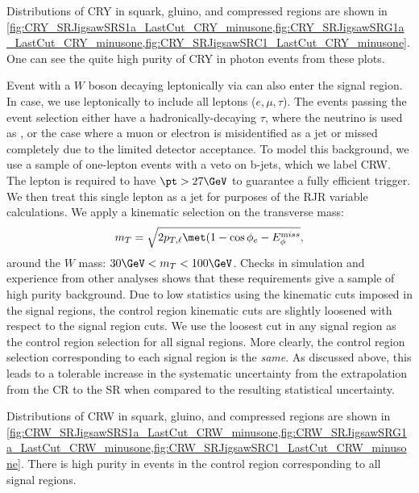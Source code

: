 Distributions of CRY in squark, gluino, and compressed regions are shown in \ref{fig:CRY_SRJigsawSRS1a_LastCut_CRY_minusone,fig:CRY_SRJigsawSRG1a_LastCut_CRY_minusone,fig:CRY_SRJigsawSRC1_LastCut_CRY_minusone}.
One can see the quite high purity of CRY in photon events from these plots.

Event with a $W$ boson decaying leptonically via \wln can also enter the signal region.
In case, we use leptonically to include all leptons ($e,\mu,\tau$).
The \wjets events passing the event selection either have a hadronically-decaying $\tau$, where the neutrino is used as \met, or the case where a muon or electron is misidentified as a jet or missed completely due to the limited detector acceptance.
To model this background, we use a sample of one-lepton events with a veto on b-jets, which we label CRW.
The lepton is required to have $\pt > 27 \GeV$ to guarantee a fully efficient trigger.
We then treat this single lepton as a jet for purposes of the RJR variable calculations.
We apply a kinematic selection on the transverse mass:
\begin{align}
m_T = \sqrt{2p_{T,\ell} \met ( 1 - \cos{ \phi_{e} - \metphi } },
\end{align}
around the $W$ mass: $30 \GeV < m_T < 100 \GeV$.
Checks in simulation and experience from other analyses shows that these requirements give a sample of high purity \wln background.
Due to low statistics using the kinematic cuts imposed in the signal regions, the control region kinematic cuts are slightly loosened with respect to the signal region cuts.
We use the loosest cut in any signal region as the control region selection for all signal regions.
More clearly, the control region selection corresponding to each signal region is the \textit{same}.
As discussed above, this leads to a tolerable increase in the systematic uncertainty from the extrapolation from the CR to the SR when compared to the resulting statistical uncertainty.

Distributions of CRW in squark, gluino, and compressed regions are shown in \ref{fig:CRW_SRJigsawSRS1a_LastCut_CRW_minusone,fig:CRW_SRJigsawSRG1a_LastCut_CRW_minusone,fig:CRW_SRJigsawSRC1_LastCut_CRW_minusone}.
There is high purity in \wjets events in the control region corresponding to all signal regions.

